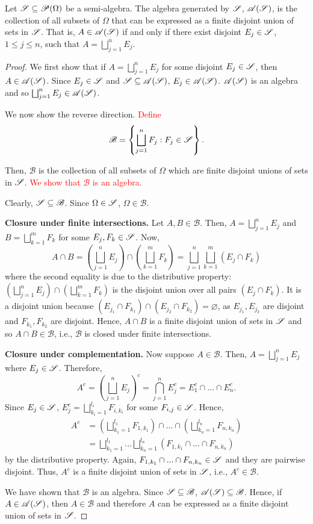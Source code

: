 \begin{lemma}
  Let $\mathscr{S} \subseteq \mathscr{P}(\Omega)$ be a semi-algebra. The algebra generated by $\mathscr{S}$, $\mathscr{A}(\mathscr{S})$, is the collection of all subsets of $\Omega$ that can be expressed as a finite disjoint union of sets in $\mathscr{S}$. That is, $A \in \mathscr{A}(\mathscr{S})$ if and only if there exist disjoint $E_j \in \mathscr{S}$, $1 \leq j \leq n$, such that $A = \bigsqcup_{j = 1}^n E_j$. 
\end{lemma}

\begin{proof}
  We first show that if $A = \bigsqcup_{j = 1}^n E_j$ for some disjoint $E_j \in \mathscr{S}$, then $A \in \mathscr{A}(\mathscr{S})$. Since $E_j \in \mathscr{S}$ and $\mathscr{S} \subseteq \mathscr{A}(\mathscr{S})$, $E_j \in \mathscr{A}(\mathscr{S})$. $\mathscr{A}(\mathscr{S})$ is an algebra and so $\bigsqcup_{j = 1}^n E_j \in \mathscr{A}(\mathscr{S})$.

  We now show the reverse direction. \textcolor{red}{Define
  \[
  \mathscr{B} = \left\{ \bigsqcup_{j = 1}^n F_j : F_j \in \mathscr{S} \right\}.
  \]
  }

  Then, $\mathscr{B}$ is the collection of all subsets of $\Omega$ which are finite disjoint unions of sets in $\mathscr{S}$. \textcolor{red}{We show that $\mathscr{B}$ is an algebra.}

  Clearly, $\mathscr{S} \subseteq \mathscr{B}$. Since $\Omega \in \mathscr{S}$, $\Omega \in \mathscr{B}$.

  \textbf{Closure under finite intersections.} Let $A, B \in \mathscr{B}$. Then, $A = \bigsqcup_{j = 1}^n E_j$ and $B = \bigsqcup_{k = 1}^m F_k$ for some $E_j, F_k \in \mathscr{S}$. Now, 
  \[
  A \cap B = \left( \bigsqcup_{j = 1}^n E_j \right) \cap \left( \bigsqcup_{k = 1}^m F_k \right) = \bigsqcup_{j = 1}^n \bigsqcup_{k = 1}^m (E_j \cap F_k)
  \]
  where the second equality is due to the distributive property: $\left( \bigsqcup_{j = 1}^n E_j \right) \cap \left( \bigsqcup_{k = 1}^m F_k \right)$ is the disjoint union over all pairs $(E_j \cap F_k)$. It is a disjoint union because $(E_{j_1} \cap F_{k_1}) \cap (E_{j_2} \cap F_{k_2}) = \varnothing$, as $E_{j_1}, E_{j_2}$ are disjoint and $F_{k_1}, F_{k_2}$ are disjoint. Hence, $A \cap B$ is a finite disjoint union of sets in $\mathscr{S}$ and so $A \cap B \in \mathscr{B}$, i.e., $\mathscr{B}$ is closed under finite intersections. 

  \textbf{Closure under complementation.} Now suppose $A \in \mathscr{B}$. Then, $A = \bigsqcup_{j = 1}^n E_j$ where $E_j \in \mathscr{S}$. Therefore, 
  \[
  A^c = \left( \bigsqcup_{j = 1}^n E_j \right)^c = \bigcap_{j = 1}^n E_j^c = E_1^c \cap ... \cap E_n^c.
  \]
  Since $E_j \in \mathscr{S}$, $E_j^c = \bigsqcup_{k_i = 1}^{l_i} F_{i, k_i}$ for some $F_{i, j} \in \mathscr{S}$. Hence, 
  \begin{align*}
  A^c &= \left( \bigsqcup_{k_1 = 1}^{l_1} F_{1, k_1} \right) \cap ... \cap \left( \bigsqcup_{k_n = 1}^{l_n} F_{n, k_n} \right) \\
  &= \bigsqcup_{k_1 = 1}^{l_1} ... \bigsqcup_{k_n = 1}^{l_n} (F_{1, k_1} \cap ... \cap F_{n, k_n})
  \end{align*}
  by the distributive property. Again, $F_{1, k_1} \cap ... \cap F_{n, k_n} \in \mathscr{S}$ and they are pairwise disjoint. Thus, $A^c$ is a finite disjoint union of sets in $\mathscr{S}$, i.e., $A^c \in \mathscr{B}$.

  We have shown that $\mathscr{B}$ is an algebra. Since $\mathscr{S} \subseteq \mathscr{B}$, $\mathscr{A}(\mathscr{S}) \subseteq \mathscr{B}$. Hence, if $A \in \mathscr{A}(\mathscr{S})$, then $A \in \mathscr{B}$ and therefore $A$ can be expressed as a finite disjoint union of sets in $\mathscr{S}$.
\end{proof}